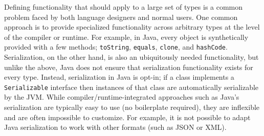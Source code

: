 \documentclass[preprint,nocopyrightspace]{sigplanconf}
\newcommand{\selfassembly}{\texttt{self-assembly~}}
\newcommand{\Selfassembly}{\texttt{Self-assembly~}}
\newcommand{\sselfassembly}{\texttt{self-assembly}}
\begin{document}



Defining functionality that should apply to a large set of types is a common
problem faced by both language designers and normal users.
One common approach is to provide specialized functionality across
arbitrary types at the level of the compiler or runtime. For example, in Java,
every object is synthetically provided with a few methods;
\lstinline{toString}, \lstinline{equals}, \lstinline{clone}, and
\lstinline{hashCode}. Serialization, on the other hand, is also an
ubiquitously needed functionality, but unlike the above, Java does not ensure
that serialization functionality exists for every type. Instead, serialization
in Java is opt-in; if a class implements a \lstinline{Serializable} interface
then instances of that class are automatically serializable by the JVM. While
compiler/runtime-integrated approaches such as Java's serialization are typically easy to use
(no boilerplate required), they are inflexible and are often impossible to
customize. For example, it is not possible to adapt Java serialization to work
with other formats (such as JSON or XML).
\end{document}
